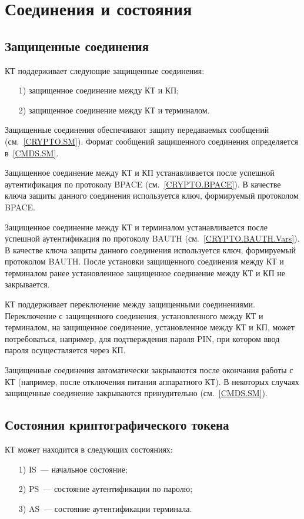\chapter{Соединения и состояния}\label{STATES}

\section{Защищенные соединения}\label{STATES.SM}

КТ поддерживает следующие защищенные соединения:
%
\begin{itemize}
\item[1)]
защищенное соединение между КТ и КП;
\item[2)]
защищенное соединение между КТ и терминалом.
\end{itemize}
%
Защищенные соединения обеспечивают защиту передаваемых сообщений
(см.~\ref{CRYPTO.SM}). Формат сообщений защишенного
соединения определяется в~\ref{CMDS.SM}.

Защищенное соединение между КТ и КП устанавливается 
после успешной аутентификация по протоколу BPACE (см.~\ref{CRYPTO.BPACE}).
В качестве ключа защиты данного соединения используется 
ключ, формируемый протоколом BPACE.

Защищенное соединение между КТ и терминалом устанавливается 
после успешной аутентификация по протоколу BAUTH (см.~\ref{CRYPTO.BAUTH.Vars}).
В качестве ключа защиты данного соединения используется 
ключ, формируемый протоколом BAUTH.
После установки защищенного соединения между КТ и терминалом
ранее установленное защищенное соединение между КТ и КП
не закрывается. 

КТ поддерживает переключение между защищенными соединениями.
Переключение с защищенного соединения, установленного 
между КТ и терминалом, на защищенное соединение,
установленное между КТ и КП, 
может потребоваться, например,
для подтверждения пароля PIN, при котором ввод 
пароля осуществляется через КП. 

Защищенные соединения автоматически закрываются 
после окончания работы с КТ 
(например, после отключения питания аппаратного КТ).
В некоторых случаях защищенные соединение закрываются
принудительно (см.~\ref{CMDS.SM}).

\section{Состояния криптографического токена}\label{STATES.ST}

КТ может находится в следующих состояниях:
%
\begin{itemize}
\item[1)]
IS~--- начальное состояние;
\item[2)]
PS~--- состояние аутентификации по паролю;
\item[3)]
AS~--- состояние аутентификации терминала.
\end{itemize}


